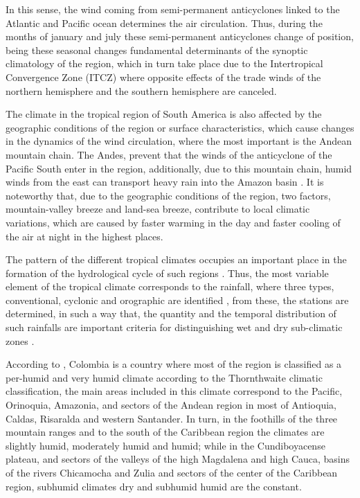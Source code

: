\documentclass[12pt,halfline,a4paper]{ouparticle}
\begin{document}
In this sense, the wind coming from semi-permanent anticyclones linked to the Atlantic and Pacific ocean determines the air circulation. Thus, during the months of january and july these semi-permanent anticyclones change of position, being these seasonal changes fundamental determinants of the synoptic climatology of the region, which in turn take place due to the Intertropical Convergence Zone (ITCZ) where opposite effects of the trade winds of the northern hemisphere and the southern hemisphere are canceled.

The climate in the tropical region of South America is also affected by the geographic conditions of the region or surface characteristics, which cause changes in the dynamics of the wind circulation, where the most important is the Andean mountain chain. The Andes, prevent that the winds of the anticyclone of the Pacific South enter in the region, additionally, due to this mountain chain, humid winds from the east can transport heavy rain into the Amazon basin \citep{Eidt1969}. It is noteworthy that, due to the geographic conditions of the region, two factors, mountain-valley breeze and land-sea breeze, contribute to local climatic variations, which are caused by faster warming in the day and faster cooling of the air at night in the highest places.

The pattern of the different tropical climates occupies an important place in the formation of the hydrological cycle of such regions \citep{Balek1983}. Thus, the most variable element of the tropical climate corresponds to the rainfall, where three types, conventional, cyclonic and orographic are identified \citep{McGregor1998}, from these, the stations are determined, in such a way that, the quantity and the temporal distribution of such rainfalls are important criteria for distinguishing wet and dry sub-climatic zones \citep{Latrubesse2005}.

According to \cite{Ideam2005}, Colombia is a country where most of the region is classified as a per-humid and very humid climate according to the Thornthwaite climatic classification, the main areas included in this climate correspond to the Pacific, Orinoquia, Amazonia, and sectors of the Andean region in most of Antioquia, Caldas, Risaralda and western Santander. In turn, in the foothills of the three mountain ranges and to the south of the Caribbean region the climates are slightly humid, moderately humid and humid; while in the Cundiboyacense plateau, and sectors of the valleys of the high Magdalena and high Cauca, basins of the rivers Chicamocha and Zulia and sectors of the center of the Caribbean region, subhumid climates dry and subhumid humid are the constant.
\end{document}
